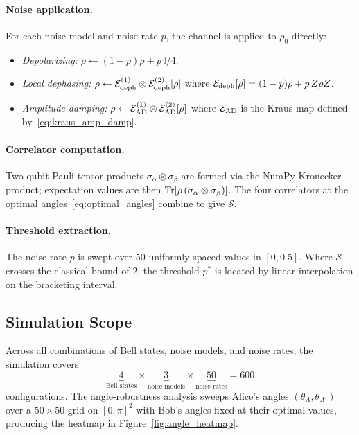 \documentclass[12pt]{article}
\newcommand{\pstar}{p^*}
\newcommand{\bigS}{\mathcal{S}}
\newcommand{\Id}{\mathbb{I}}
\begin{document}
\paragraph{Noise application.}
For each noise model and noise rate $p$, the channel is applied to $\rho_0$ directly:
\begin{itemize}
  \item \textit{Depolarizing:} $\rho \leftarrow (1-p)\rho + p\,\Id/4$.
  \item \textit{Local dephasing:} $\rho \leftarrow \mathcal{E}_{\rm deph}^{(1)} \otimes \mathcal{E}_{\rm deph}^{(2)}[\rho]$
        where $\mathcal{E}_{\rm deph}[\rho] = (1-p)\rho + p\,Z\rho Z$.
  \item \textit{Amplitude damping:} $\rho \leftarrow \mathcal{E}_{\rm AD}^{(1)} \otimes \mathcal{E}_{\rm AD}^{(2)}[\rho]$
        where $\mathcal{E}_{\rm AD}$ is the Kraus map defined by~\eqref{eq:kraus_amp_damp}.
\end{itemize}

\paragraph{Correlator computation.}
Two-qubit Pauli tensor products $\sigma_\alpha \otimes \sigma_\beta$ are formed via the NumPy
Kronecker product; expectation values are then $\Tr[\rho\,(\sigma_\alpha\otimes\sigma_\beta)]$.
The four correlators at the optimal angles~\eqref{eq:optimal_angles} combine to give $\bigS$.

\paragraph{Threshold extraction.}
The noise rate $p$ is swept over 50 uniformly spaced values in $[0, 0.5]$.
Where $\bigS$ crosses the classical bound of $2$, the threshold $\pstar$ is located by linear
interpolation on the bracketing interval.

\subsection{Simulation Scope}
\label{subsec:scope}

Across all combinations of Bell states, noise models, and noise rates, the simulation covers
\[
  \underbrace{4}_{\text{Bell states}} \times \underbrace{3}_{\text{noise models}} \times \underbrace{50}_{\text{noise rates}} = 600
\]
configurations.
The angle-robustness analysis sweeps Alice's angles $(\theta_A, \theta_{A'})$ over a $50\times 50$
grid on $[0,\pi]^2$ with Bob's angles fixed at their optimal values, producing the heatmap in
Figure~\ref{fig:angle_heatmap}.
\end{document}
